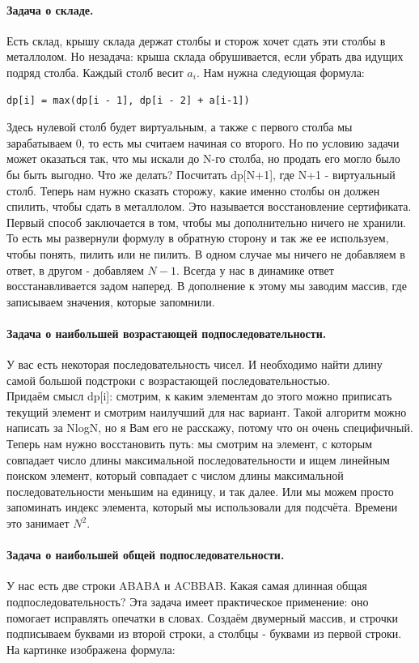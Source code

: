 \documentclass[12pt]{article}
\begin{document}
\paragraph*{Задача о складе.}
Есть склад, крышу склада держат столбы и сторож хочет сдать эти столбы в металлолом. Но незадача: крыша склада обрушивается, если убрать два идущих подряд столба. Каждый столб весит $a_i$. Нам нужна следующая формула:
\begin{verbatim}
dp[i] = max(dp[i - 1], dp[i - 2] + a[i-1])
\end{verbatim}
Здесь нулевой столб будет виртуальным, а также с первого столба мы зарабатываем 0, то есть мы считаем начиная со второго. Но по условию задачи может оказаться так, что мы искали до N-го столба, но продать его могло было бы быть выгодно. Что же делать? Посчитать dp[N+1], где N+1 - виртуальный столб. Теперь нам нужно сказать сторожу, какие именно столбы он должен спилить, чтобы сдать в металлолом. Это называется восстановление сертификата. Первый способ заключается в том, чтобы мы дополнительно ничего не хранили. То есть мы развернули формулу в обратную сторону и так же ее используем, чтобы понять, пилить или не пилить. В одном случае мы ничего не добавляем в ответ, в другом - добавляем $N - 1$. Всегда у нас в динамике ответ восстанавливается задом наперед. В дополнение к этому мы заводим массив, где записываем значения, которые запомнили. 
\paragraph*{Задача о наибольшей возрастающей подпоследовательности.}
У вас есть некоторая последовательность чисел. И необходимо найти длину самой большой подстроки с возрастающей последовательностью. \\
Придаём смысл dp[i]: смотрим, к каким элементам до этого можно приписать текущий элемент и смотрим наилучший для нас вариант. Такой алгоритм можно написать за NlogN, но я Вам его не расскажу, потому что он очень специфичный. Теперь нам нужно восстановить путь: мы смотрим на элемент, с которым совпадает число длины максимальной последовательности и ищем линейным поиском элемент, который совпадает с числом длины максимальной последовательности меньшим на единицу, и так далее. Или мы можем просто запоминать индекс элемента, который мы использовали для подсчёта. Времени это занимает $N^2$.
\paragraph*{Задача о наибольшей общей подпоследовательности.}
У нас есть две строки ABABA и ACBBAB. Какая самая длинная общая подпоследовательность? Эта задача имеет практическое применение: оно помогает исправлять опечатки в словах. Создаём двумерный массив, и строчки подписываем буквами из второй строки, а столбцы - буквами из первой строки. На картинке изображена формула:
\end{document}
